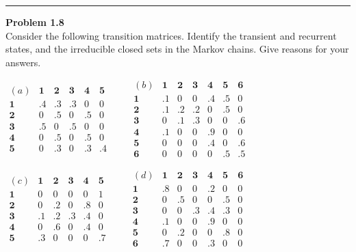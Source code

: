 \documentclass[a4paper, 11pt]{article}
\newenvironment{problem}[2][Problem]
    { \begin{mdframed}[backgroundcolor=gray!20] \textbf{#1 #2} \\}
    {  \end{mdframed}}
\begin{document}
\noindent\rule{7in}{2.8pt}

\begin{problem}{1.8}
    Consider the following transition matrices. Identify the transient and recurrent states, 
    and the irreducible closed sets in the Markov chains. Give reasons for your answers.
	\begin{center}
	$
	\begin{matrix}
	(a) 	& \bm{1} & \bm{2} & \bm{3} & \bm{4} & \bm{5} \\ 
	\bm{1}	& .4	&.3		&.3		&0		&0		\\
	\bm{2}	& 0		&.5		&0		&.5		&0		\\
	\bm{3}	& .5	&0		&.5		&0		&0		\\
	\bm{4}	& 0		&.5		&0		&.5		&0		\\
	\bm{5}	& 0		&.3		&0		&.3		&.4			
	\end{matrix}\qquad \begin{matrix}
	(b) 	& \bm{1} & \bm{2} & \bm{3} & \bm{4} & \bm{5}  & \bm{6}\\ 
	\bm{1}	&.1		&0		&0		&.4		&.5		&0		\\
	\bm{2}	&.1		&.2		&.2		&0		&.5		&0		\\
	\bm{3}	&0		&.1		&.3		&0		&0		&.6		\\
	\bm{4}	&.1		&0		&0		&.9		&0		&0		\\
	\bm{5}	&0		&0		&0		&.4		&0		&.6		\\	
	\bm{6}	&0		&0		&0		&0		&.5		&.5
	\end{matrix}
	$
	\end{center}
	\begin{center}
	$
	\begin{matrix}
	(c) 	& \bm{1} & \bm{2} & \bm{3} & \bm{4} & \bm{5} \\ 
	\bm{1}	&0		&0		&0		&0		&1		\\
	\bm{2}	&0		&.2		&0		&.8		&0		\\
	\bm{3}	&.1		&.2		&.3		&.4		&0		\\
	\bm{4}	&0		&.6		&0		&.4		&0		\\
	\bm{5}	&.3		&0		&0		&0		&.7			
	\end{matrix}\qquad \begin{matrix}
	(d) 	& \bm{1} & \bm{2} & \bm{3} & \bm{4} & \bm{5}  & \bm{6}\\ 
	\bm{1}	&.8		&0		&0		&.2		&0		&0		\\
	\bm{2}	&0		&.5		&0		&0		&.5		&0		\\
	\bm{3}	&0		&0		&.3		&.4		&.3		&0		\\
	\bm{4}	&.1		&0		&0		&.9		&0		&0		\\
	\bm{5}	&0		&.2		&0		&0		&.8		&0		\\	
	\bm{6}	&.7		&0		&0		&.3		&0		&0
	\end{matrix}
	$
	\end{center}

\end{problem}
\end{document}
